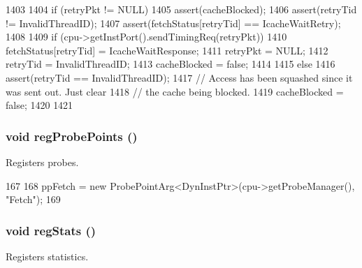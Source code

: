 \begin{DoxyCode}
1403 {
1404     if (retryPkt != NULL) {
1405         assert(cacheBlocked);
1406         assert(retryTid != InvalidThreadID);
1407         assert(fetchStatus[retryTid] == IcacheWaitRetry);
1408 
1409         if (cpu->getInstPort().sendTimingReq(retryPkt)) {
1410             fetchStatus[retryTid] = IcacheWaitResponse;
1411             retryPkt = NULL;
1412             retryTid = InvalidThreadID;
1413             cacheBlocked = false;
1414         }
1415     } else {
1416         assert(retryTid == InvalidThreadID);
1417         // Access has been squashed since it was sent out.  Just clear
1418         // the cache being blocked.
1419         cacheBlocked = false;
1420     }
1421 }
\end{DoxyCode}
\hypertarget{classDefaultFetch_aa2dab17a363fd4307274d579796adcf7}{
\subsubsection[{regProbePoints}]{\setlength{\rightskip}{0pt plus 5cm}void regProbePoints ()}}
\label{classDefaultFetch_aa2dab17a363fd4307274d579796adcf7}
Registers probes. 


\begin{DoxyCode}
167 {
168     ppFetch = new ProbePointArg<DynInstPtr>(cpu->getProbeManager(), "Fetch");
169 }
\end{DoxyCode}
\hypertarget{classDefaultFetch_a4dc637449366fcdfc4e764cdf12d9b11}{
\subsubsection[{regStats}]{\setlength{\rightskip}{0pt plus 5cm}void regStats ()}}
\label{classDefaultFetch_a4dc637449366fcdfc4e764cdf12d9b11}
Registers statistics. 


